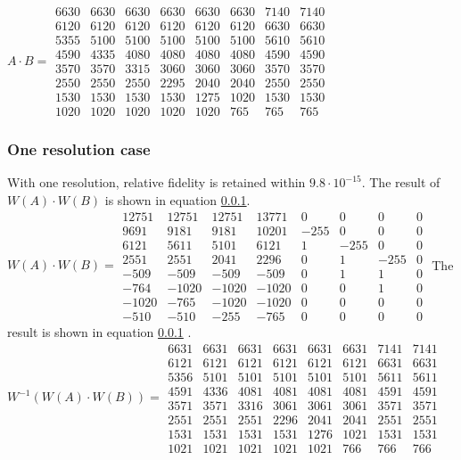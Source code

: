 \documentclass{article}
\begin{document}
$ A \cdot B =
\begin{array}{cccccccc}
6630 & 6630 & 6630 & 6630 & 6630 & 6630 & 7140 & 7140\\
6120 & 6120 & 6120 & 6120 & 6120 & 6120 & 6630 & 6630\\
5355 & 5100 & 5100 & 5100 & 5100 & 5100 & 5610 & 5610\\
4590 & 4335 & 4080 & 4080 & 4080 & 4080 & 4590 & 4590\\
3570 & 3570 & 3315 & 3060 & 3060 & 3060 & 3570 & 3570\\
2550 & 2550 & 2550 & 2295 & 2040 & 2040 & 2550 & 2550\\
1530 & 1530 & 1530 & 1530 & 1275 & 1020 & 1530 & 1530\\
1020 & 1020 & 1020 & 1020 & 1020 & 765 & 765 & 765
\end{array}
$

\subsubsection {One resolution case}
With one resolution, relative fidelity is retained within $9.8 \cdot 10^{-15}$.  The result of $W(A)\cdot  W(B)$ is shown in equation \ref{}.\\
$ W(A) \cdot W(B) =
\begin{array}{cccccccc}
12751 & 12751 & 12751 & 13771 & 0 & 0 & 0 & 0\\
9691 & 9181 & 9181 & 10201 & -255 & 0 & 0 & 0\\
6121 & 5611 & 5101 & 6121 & 1 & -255 & 0 & 0\\
2551 & 2551 & 2041 & 2296 & 0 & 1 & -255 & 0\\
-509 & -509 & -509 & -509 & 0 & 1 & 1 & 0\\
-764 & -1020 & -1020 & -1020 & 0 & 0 & 1 & 0\\
-1020 & -765 & -1020 & -1020 & 0 & 0 & 0 & 0\\
-510 & -510 & -255 & -765 & 0 & 0 & 0 & 0
\end{array}
$
The result is shown in equation \ref{} .\\
$ W^{-1}(W(A) \cdot W(B)) =
\begin{array}{cccccccc}
6631 & 6631 & 6631 & 6631 & 6631 & 6631 & 7141 & 7141\\
6121 & 6121 & 6121 & 6121 & 6121 & 6121 & 6631 & 6631\\
5356 & 5101 & 5101 & 5101 & 5101 & 5101 & 5611 & 5611\\
4591 & 4336 & 4081 & 4081 & 4081 & 4081 & 4591 & 4591\\
3571 & 3571 & 3316 & 3061 & 3061 & 3061 & 3571 & 3571\\
2551 & 2551 & 2551 & 2296 & 2041 & 2041 & 2551 & 2551\\
1531 & 1531 & 1531 & 1531 & 1276 & 1021 & 1531 & 1531\\
1021 & 1021 & 1021 & 1021 & 1021 & 766 & 766 & 766 
\end{array}
$
\end{document}
